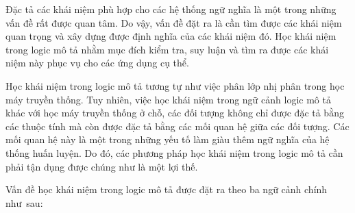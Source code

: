 Đặc tả các khái niệm phù hợp cho các hệ thống ngữ nghĩa là một trong những vấn đề rất được quan tâm. Do vậy, vấn đề đặt ra là cần tìm được các khái niệm quan trọng và xây dựng được định nghĩa của các khái niệm đó. Học khái niệm trong logic mô tả nhằm mục đích kiểm tra, suy luận và tìm ra được các khái niệm này phục vụ cho các ứng dụng cụ thể.

Học khái niệm trong logic mô tả tương tự như việc phân lớp nhị phân trong học máy truyền thống. Tuy nhiên, việc học khái niệm trong ngữ cảnh logic mô tả khác với học máy truyền thống ở chỗ, các đối tượng không chỉ được đặc tả bằng các thuộc tính mà còn được đặc tả bằng các mối quan hệ giữa các đối tượng. Các mối quan hệ này là một trong những yếu tố làm giàu thêm ngữ nghĩa của hệ thống huấn luyện. Do đó, các phương pháp học khái niệm trong logic mô tả cần phải tận dụng được chúng như là một lợi thế.

Vấn đề học khái niệm trong logic mô tả được đặt ra theo ba ngữ cảnh chính như~sau:\\[1.0ex]

